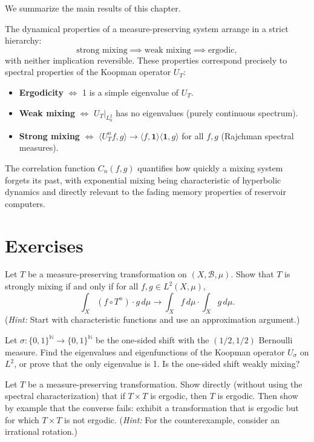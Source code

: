 We summarize the main results of this chapter.

The dynamical properties of a measure-preserving system arrange in a strict hierarchy:
\[
\text{strong mixing} \implies \text{weak mixing} \implies \text{ergodic},
\]
with neither implication reversible. These properties correspond precisely to spectral properties of the Koopman operator $U_T$:

\begin{itemize}[nosep]
  \item \textbf{Ergodicity} $\Longleftrightarrow$ 1 is a simple eigenvalue of $U_T$.
  \item \textbf{Weak mixing} $\Longleftrightarrow$ $U_T|_{L^2_0}$ has no eigenvalues (purely continuous spectrum).
  \item \textbf{Strong mixing} $\Longleftrightarrow$ $\langle U_T^n f, g \rangle \to \langle f, \mathbf{1}\rangle\langle \mathbf{1}, g\rangle$ for all $f, g$ (Rajchman spectral measures).
\end{itemize}

The correlation function $C_n(f,g)$ quantifies how quickly a mixing system forgets its past, with exponential mixing being characteristic of hyperbolic dynamics and directly relevant to the fading memory properties of reservoir computers.


\section*{Exercises}

\begin{exercise}
Let $T$ be a measure-preserving transformation on $(X, \mathcal{B}, \mu)$. Show that $T$ is strongly mixing if and only if for all $f, g \in L^2(X, \mu)$,
\[
\int_X (f \circ T^n) \cdot g \, d\mu \to \int_X f \, d\mu \cdot \int_X g \, d\mu.
\]
(\textit{Hint:} Start with characteristic functions and use an approximation argument.)
\end{exercise}


\begin{exercise}
Let $\sigma: \{0,1\}^{\mathbb{N}} \to \{0,1\}^{\mathbb{N}}$ be the one-sided shift with the $(1/2, 1/2)$ Bernoulli measure. Find the eigenvalues and eigenfunctions of the Koopman operator $U_\sigma$ on $L^2$, or prove that the only eigenvalue is 1. Is the one-sided shift weakly mixing?
\end{exercise}


\begin{exercise}
Let $T$ be a measure-preserving transformation. Show directly (without using the spectral characterization) that if $T \times T$ is ergodic, then $T$ is ergodic. Then show by example that the converse fails: exhibit a transformation that is ergodic but for which $T \times T$ is not ergodic.
(\textit{Hint:} For the counterexample, consider an irrational rotation.)
\end{exercise}


